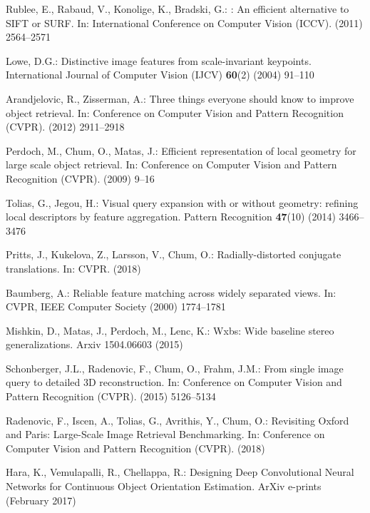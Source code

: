 \documentclass[runningheads]{llncs}
\begin{document}
{\begin{thebibliography}{10}
Rublee, E., Rabaud, V., Konolige, K., Bradski, G.:
: An efficient alternative to {SIFT} or {SURF}.
\newblock In: International Conference on Computer Vision ({ICCV}). (2011)
  2564--2571

Lowe, D.G.:
\newblock Distinctive image features from scale-invariant keypoints.
\newblock International Journal of Computer Vision ({IJCV}) \textbf{60}(2)
  (2004)  91--110

Arandjelovic, R., Zisserman, A.:
\newblock Three things everyone should know to improve object retrieval.
\newblock In: Conference on Computer Vision and Pattern Recognition ({CVPR}).
  (2012)  2911--2918

Perdoch, M., Chum, O., Matas, J.:
\newblock Efficient representation of local geometry for large scale object
  retrieval.
\newblock In: Conference on Computer Vision and Pattern Recognition ({CVPR}).
  (2009)  9--16

Tolias, G., Jegou, H.:
\newblock Visual query expansion with or without geometry: refining local
  descriptors by feature aggregation.
\newblock Pattern Recognition \textbf{47}(10) (2014)  3466--3476

Pritts, J., Kukelova, Z., Larsson, V., Chum, O.:
\newblock Radially-distorted conjugate translations.
\newblock In: CVPR. (2018)

Baumberg, A.:
\newblock Reliable feature matching across widely separated views.
\newblock In: CVPR, IEEE Computer Society (2000)  1774--1781

Mishkin, D., Matas, J., Perdoch, M., Lenc, K.:
\newblock Wxbs: Wide baseline stereo generalizations.
\newblock Arxiv 1504.06603 (2015)

Schonberger, J.L., Radenovic, F., Chum, O., Frahm, J.M.:
\newblock From single image query to detailed {3D} reconstruction.
\newblock In: Conference on Computer Vision and Pattern Recognition ({CVPR}).
  (2015)  5126--5134



Radenovic, F., Iscen, A., Tolias, G., Avrithis, Y., Chum, O.:
\newblock Revisiting Oxford and Paris: Large-Scale Image Retrieval Benchmarking.
\newblock In: Conference on Computer Vision and Pattern Recognition {(CVPR)}.
  (2018)


Hara, K., Vemulapalli, R., Chellappa, R.:
\newblock Designing Deep Convolutional Neural Networks for Continuous Object Orientation Estimation.
\newblock ArXiv e-prints (February 2017)



\end{thebibliography}}
\end{document}
